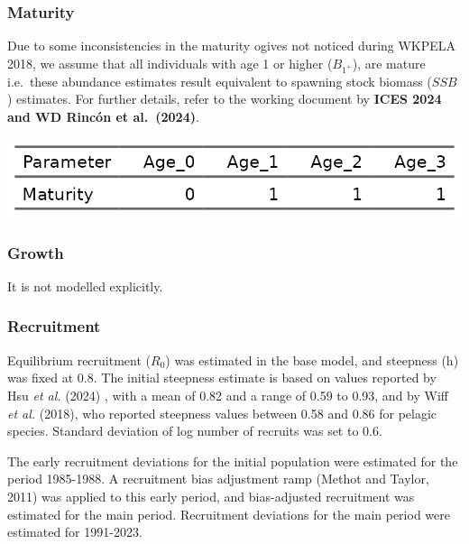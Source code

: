 \documentclass[
]{article}
\begin{document}
\hypertarget{maturity}{%
\subsubsection{Maturity}\label{maturity}}

Due to some inconsistencies in the maturity ogives not noticed during
WKPELA 2018, we assume that all individuals with age 1 or higher
(\(B_{1^+}\)), are mature i.e.~these abundance estimates result
equivalent to spawning stock biomass (\(SSB\)) estimates. For further
details, refer to the working document by \textbf{ICES 2024 and WD
Rincón et al.~(2024)}.

\begin{center}\includegraphics[width=0.95\linewidth]{report/run/S1.0_4FLEETS_SelECO_RecIndex_Mnewfix/tb_maturity} \end{center}

\hypertarget{growth}{%
\subsubsection{Growth}\label{growth}}

It is not modelled explicitly.

\hypertarget{recruitment}{%
\subsubsection{Recruitment}\label{recruitment}}

Equilibrium recruitment (\(R_0\)) was estimated in the base model, and
steepness (h) was fixed at 0.8. The initial steepness estimate is based
on values reported by Hsu \emph{et al.} (2024) , with a mean of 0.82 and
a range of 0.59 to 0.93, and by Wiff \emph{et al.} (2018), who reported
steepness values between 0.58 and 0.86 for pelagic species. Standard
deviation of log number of recruits was set to 0.6.

The early recruitment deviations for the initial population were
estimated for the period 1985-1988. A recruitment bias adjustment ramp
(Methot and Taylor, 2011) was applied to this early period, and
bias-adjusted recruitment was estimated for the main period. Recruitment
deviations for the main period were estimated for 1991-2023.
\end{document}
